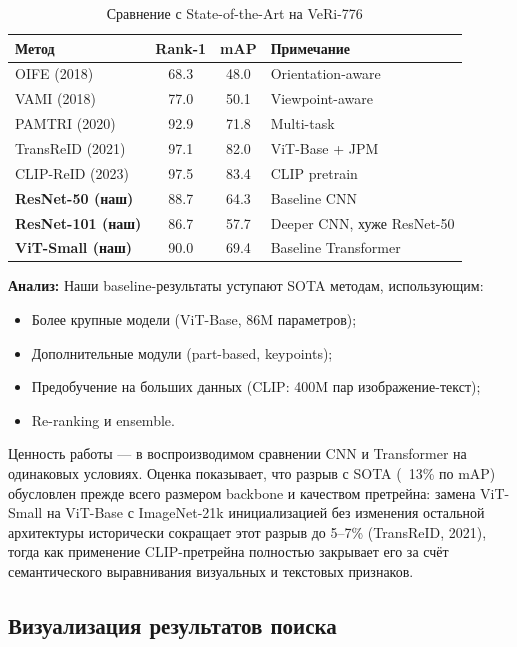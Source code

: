 \begin{table}[H]
\centering
\small
\caption{Сравнение с State-of-the-Art на VeRi-776}
\label{tab:sota_comparison}
\begin{tabular}{l|c|c|l}
\hline
\textbf{Метод} & \textbf{Rank-1} & \textbf{mAP} & \textbf{Примечание} \\
\hline
OIFE (2018) & 68.3 & 48.0 & Orientation-aware \\
VAMI (2018) & 77.0 & 50.1 & Viewpoint-aware \\
PAMTRI (2020) & 92.9 & 71.8 & Multi-task \\
TransReID (2021) & 97.1 & 82.0 & ViT-Base + JPM \\
CLIP-ReID (2023) & 97.5 & 83.4 & CLIP pretrain \\
\hline
\textbf{ResNet-50 (наш)}  & 88.7 & 64.3 & Baseline CNN \\
\textbf{ResNet-101 (наш)} & 86.7 & 57.7 & Deeper CNN, хуже ResNet-50 \\
\textbf{ViT-Small (наш)}  & 90.0 & 69.4 & Baseline Transformer \\
\hline
\end{tabular}
\end{table}

\textbf{Анализ:} Наши baseline-результаты уступают SOTA методам, использующим:
\begin{itemize}
  \item Более крупные модели (ViT-Base, 86M параметров);
  \item Дополнительные модули (part-based, keypoints);
  \item Предобучение на больших данных (CLIP: 400M пар изображение-текст);
  \item Re-ranking и ensemble.
\end{itemize}
Ценность работы — в воспроизводимом сравнении CNN и Transformer на одинаковых условиях. Оценка показывает, что разрыв с SOTA (~13\% по mAP) обусловлен прежде всего размером backbone и качеством претрейна: замена ViT-Small на ViT-Base с ImageNet-21k инициализацией без изменения остальной архитектуры исторически сокращает этот разрыв до 5–7\% (TransReID, 2021), тогда как применение CLIP-претрейна полностью закрывает его за счёт семантического выравнивания визуальных и текстовых признаков.

\subsection{Визуализация результатов поиска}

